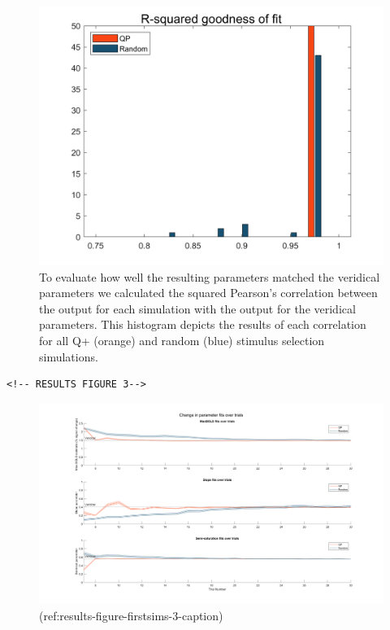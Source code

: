 \documentclass[
  man,floatsintext]{apa6}
\begin{document}
\begin{figure}
  
  {\centering \includegraphics[width=500px]{../results/figs/fig2_7Outcomes_15Noise_12trialLength_800TR} 
  
  }
  
  \caption{To evaluate how well the resulting parameters matched the veridical parameters we calculated the squared Pearson's correlation between the output for each simulation with the output for the veridical parameters. This histogram depicts the results of each correlation for all Q+ (orange) and random (blue) stimulus selection simulations.
\newpage}\label{fig:results-figure-firstsims-2}
  \end{figure}




\begin{verbatim}
<!-- RESULTS FIGURE 3-->
\end{verbatim}

\newpage

\begin{figure}
  
  {\centering \includegraphics[width=500px]{../results/figs/fig3_7Outcomes_15Noise_12trialLength_800TR} 
  
  }
  
  \caption{(ref:results-figure-firstsims-3-caption)}\label{fig:results-figure-firstsims-3}
  \end{figure}
\end{document}
